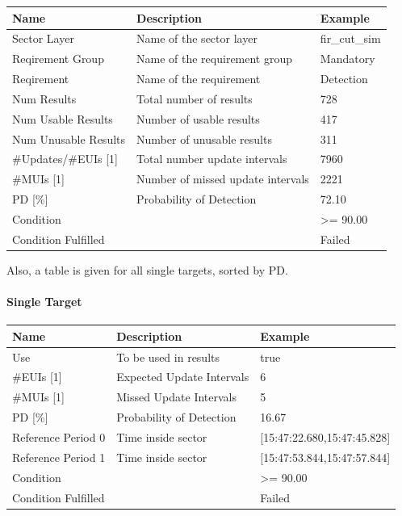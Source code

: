 \begin{center}
 \begin{table}[H]
  \begin{tabularx}{\textwidth}{ | l | X |  l | }
    \hline
    \textbf{Name} & \textbf{Description} & \textbf{Example} \\ \hline
    Sector Layer & Name of the sector layer & fir\_cut\_sim \\ \hline
    Reqirement Group & Name of the requirement group & Mandatory  \\ \hline
    Reqirement & Name of the requirement & Detection  \\ \hline
    Num Results & Total number of results & 728  \\ \hline
    Num Usable Results & Number of usable results & 417  \\ \hline
    Num Unusable Results & Number of unusable results & 311  \\ \hline
    \#Updates/\#EUIs [1] & Total number update intervals & 7960  \\ \hline
    \#MUIs [1] & Number of missed update intervals & 2221  \\ \hline
    PD [\%] & Probability of Detection & 72.10  \\ \hline
    Condition &  & >= 90.00  \\ \hline
    Condition Fulfilled &  & Failed  \\ \hline
\end{tabularx}
\end{table}
\end{center}

Also, a table is given for all single targets, sorted by PD.

\paragraph{Single Target}

\begin{center}
 \begin{table}[H]
  \begin{tabularx}{\textwidth}{ | l | X |  l | }
    \hline
    \textbf{Name} & \textbf{Description} & \textbf{Example} \\ \hline
    Use & To be used in results & true \\ \hline
    \#EUIs [1] & Expected Update Intervals & 6 \\ \hline
    \#MUIs [1] & Missed Update Intervals & 5 \\ \hline
    PD [\%] & Probability of Detection & 16.67 \\ \hline
    Reference Period 0 & Time inside sector & [15:47:22.680,15:47:45.828] \\ \hline
    Reference Period 1 & Time inside sector & [15:47:53.844,15:47:57.844] \\ \hline
    Condition &  & >= 90.00 \\ \hline
    Condition Fulfilled &  & Failed \\ \hline
\end{tabularx}
\end{table}
\end{center}


